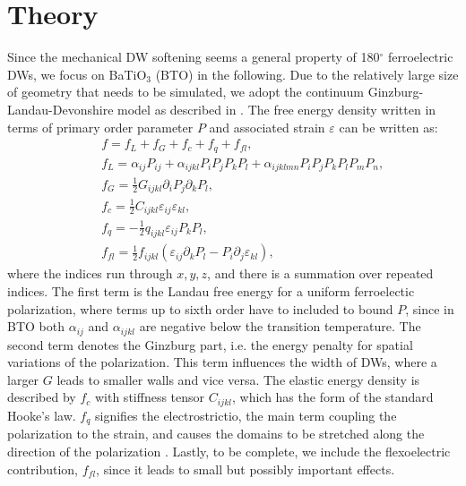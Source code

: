 
\section{Theory}
Since the mechanical DW softening seems a general property of 180$^\circ$ ferroelectric DWs, we focus on BaTiO$_3$ (BTO) in the following.
Due to the relatively large size of geometry that needs to be simulated, we adopt the continuum Ginzburg-Landau-Devonshire model as described in \cite{Marton2010}.  
The free energy density written in terms of primary order parameter $P$ and associated strain $\varepsilon$ can be written as:
\begin{eqnarray}\label{eq:BTO_energy}
&&f = f_{L}+f_{G}+f_{c}+f_{q}+f_{fl},\\
&&f_{L} = \alpha_{ij}P_{ij} + \alpha_{ijkl}P_{i}P_{j}P_{k}P_{l} + \alpha_{ijklmn} P_i P_j P_k P_l P_m P_n,\\
&&f_{G} = \frac{1}{2}G_{ijkl}\partial_i P_j\partial_k P_l,\\
&&f_{c} = \frac{1}{2}C_{ijkl}\varepsilon_{ij}\varepsilon_{kl},\\
&&f_{q}=-\frac{1}{2}q_{ijkl}\varepsilon_{ij}P_{k}P_{l},\label{eq:qpp}\\
&&f_{fl}=\frac{1}{2}f_{ijkl}(\varepsilon_{ij}\partial_k P_l - P_i\partial_j\varepsilon_{kl}),
\end{eqnarray}
where the indices run through ${x,y,z}$, and there is a summation over repeated indices.
The first term is the Landau free energy for a uniform ferroelectic polarization, where terms up to sixth order have to included to bound $P$, since in BTO both $\alpha_{ij}$ and $\alpha_{ijkl}$ are negative below the transition temperature.
The second term denotes the Ginzburg part, i.e. the energy penalty for spatial variations of the polarization.
This term influences the width of DWs, where a larger $G$ leads to smaller walls and vice versa.
The elastic energy density is described by $f_c$ with stiffness tensor $C_{ijkl}$, which has the form of the standard Hooke's law.
$f_q$ signifies the electrostrictio, the main term coupling the polarization to the strain, and causes the domains to be stretched along the direction of the polarization .
Lastly, to be complete, we include the flexoelectric contribution, $f_{fl}$, since it leads to small but possibly important effects.

